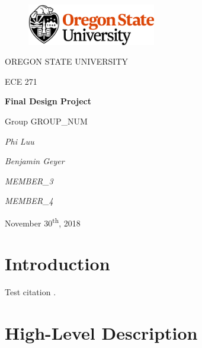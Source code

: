 \documentclass[12pt]{article}
\begin{document}
\begin{titlepage}
  \begin{center} \LARGE
    \begin{figure}[ht]
      \centering
      \includegraphics[width=0.5\textwidth]{osu_logo.png}
    \end{figure}

    \vspace{0.25in}

    OREGON STATE UNIVERSITY

    \vspace{0.25in}

    ECE 271

    \vfill

    \textbf{Final Design Project}

    Group GROUP\_NUM

    \vspace{0.5in}

    \textit{Phi Luu}

    \textit{Benjamin Geyer}

    \textit{MEMBER\_3}

    \textit{MEMBER\_4}

    \vfill

    November 30\textsuperscript{th}, 2018
  \end{center}
\end{titlepage}

\tableofcontents \newpage

\section{Introduction}

Test citation \cite{SparkFunSpi}.

\section{High-Level Description}
\end{document}
